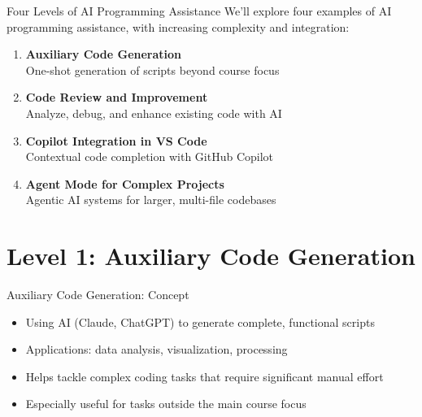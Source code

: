 \documentclass[xcolor={dvipsnames}, aspectratio=169]{beamer}
\begin{document}
\begin{frame}{Four Levels of AI Programming Assistance}
  We'll explore four examples of AI programming assistance, with increasing complexity and integration:
  
  \begin{enumerate}
    \item \textbf{Auxiliary Code Generation}\\
    One-shot generation of scripts beyond course focus
    
    \item \textbf{Code Review and Improvement}\\
    Analyze, debug, and enhance existing code with AI
    
    \item \textbf{Copilot Integration in VS Code}\\
    Contextual code completion with GitHub Copilot
    
    \item \textbf{Agent Mode for Complex Projects}\\
    Agentic AI systems for larger, multi-file codebases
  \end{enumerate}
\end{frame}

\section{Level 1: Auxiliary Code Generation}

\begin{frame}{Auxiliary Code Generation: Concept}
  \begin{itemize}
    \item Using AI (Claude, ChatGPT) to generate complete, functional scripts
    \item Applications: data analysis, visualization, processing
    \item Helps tackle complex coding tasks that require significant manual effort
    \item Especially useful for tasks outside the main course focus
  \end{itemize}
\end{frame}
\end{document}
